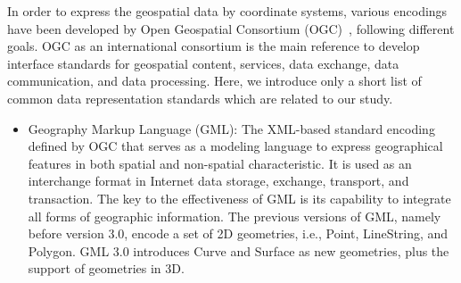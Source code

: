 \documentclass[a4paper,12pt]{article}
\begin{document}
In order to express the geospatial data by coordinate systems, various encodings have been developed by Open Geospatial Consortium (OGC)~\cite{ogc}, following different goals. OGC as an international consortium is the main reference to develop interface standards for geospatial content, services, data exchange, data communication, and data processing. Here, we introduce only a short list of common data representation standards which are related to our study.
\begin{itemize}


\item Geography Markup Language (GML): The XML-based standard encoding defined by OGC that serves as a modeling language to express geographical features in both spatial and non-spatial characteristic. It is used as an interchange format in Internet data storage, exchange, transport, and transaction. The key to the effectiveness of GML is its capability to integrate all forms of geographic information. %
The previous versions of GML, namely before version 3.0, encode a set of 2D geometries, i.e., Point, LineString, and Polygon. GML 3.0 introduces Curve and Surface as new geometries, plus the support of geometries in 3D.


\end{itemize}
\end{document}
